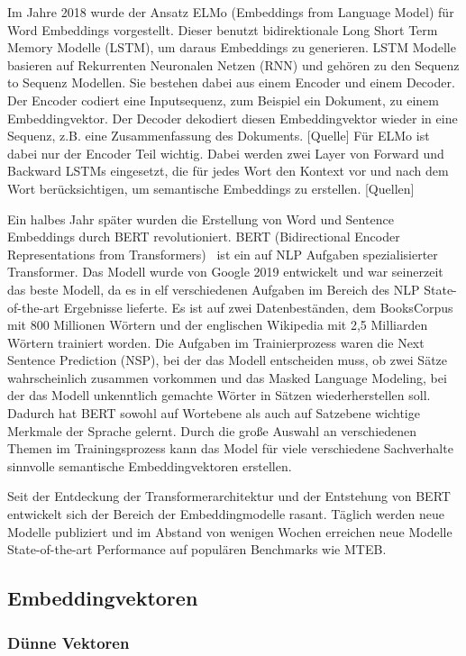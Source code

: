 Im Jahre 2018 wurde der Ansatz ELMo (Embeddings from Language Model) für Word Embeddings vorgestellt.
Dieser benutzt bidirektionale Long Short Term Memory Modelle (LSTM), um daraus Embeddings zu generieren.
LSTM Modelle basieren auf Rekurrenten Neuronalen Netzen (RNN) und gehören zu den Sequenz to Sequenz Modellen. 
Sie bestehen dabei aus einem Encoder und einem Decoder.
Der Encoder codiert eine Inputsequenz, zum Beispiel ein Dokument, zu einem Embeddingvektor. 
Der Decoder dekodiert diesen Embeddingvektor wieder in eine Sequenz, z.B. eine Zusammenfassung des Dokuments. [Quelle]
Für ELMo ist dabei nur der Encoder Teil wichtig.
Dabei werden zwei Layer von Forward und Backward LSTMs eingesetzt, die für jedes Wort den Kontext vor und nach dem Wort berücksichtigen, um semantische Embeddings zu erstellen. [Quellen]

Ein halbes Jahr später wurden die Erstellung von Word und Sentence Embeddings durch BERT revolutioniert.
BERT (Bidirectional Encoder Representations from Transformers)~\cite{devlin2019} ist ein auf NLP Aufgaben spezialisierter Transformer.
Das Modell wurde von Google 2019 entwickelt und war seinerzeit das beste Modell, da es in elf verschiedenen Aufgaben im Bereich des NLP State-of-the-art Ergebnisse lieferte.
Es ist auf zwei Datenbeständen, dem BooksCorpus mit 800 Millionen Wörtern und der englischen Wikipedia mit 2,5 Milliarden Wörtern trainiert worden. 
Die Aufgaben im Trainierprozess waren die Next Sentence Prediction (NSP), bei der das Modell entscheiden muss, ob zwei Sätze wahrscheinlich zusammen vorkommen und das Masked Language Modeling, bei der das Modell unkenntlich gemachte Wörter in Sätzen wiederherstellen soll.
Dadurch hat BERT sowohl auf Wortebene als auch auf Satzebene wichtige Merkmale der Sprache gelernt.
Durch die große Auswahl an verschiedenen Themen im Trainingsprozess kann das Model für viele verschiedene Sachverhalte sinnvolle semantische Embeddingvektoren erstellen.~\cite{devlin2019}


Seit der Entdeckung der Transformerarchitektur und der Entstehung von BERT entwickelt sich der Bereich der Embeddingmodelle rasant.
Täglich werden neue Modelle publiziert und im Abstand von wenigen Wochen erreichen neue Modelle State-of-the-art Performance auf populären Benchmarks wie MTEB.


\subsection{Embeddingvektoren}

\subsubsection{Dünne Vektoren}

